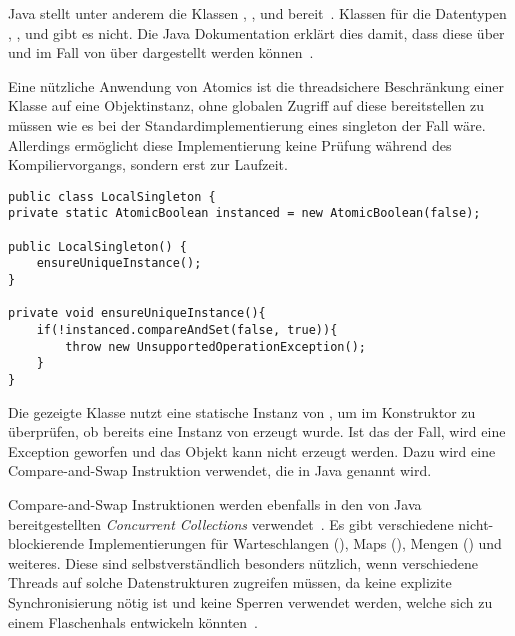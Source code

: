 Java stellt unter anderem die Klassen , ,  und 
bereit~\cite[S.~131]{Friesen2015}. Klassen für die Datentypen , ,  und  gibt es nicht. Die Java Dokumentation erklärt dies damit, dass diese über  und im Fall von  über  dargestellt werden können~\cite{Java7DocAtomic}.

Eine nützliche Anwendung von Atomics ist die threadsichere Beschränkung einer Klasse auf eine Objektinstanz, ohne globalen Zugriff auf diese bereitstellen zu müssen wie es bei der Standardimplementierung eines \gls{singleton} der Fall wäre. Allerdings ermöglicht diese Implementierung keine Prüfung während des Kompiliervorgangs, sondern erst zur Laufzeit.
\begin{lstlisting}
public class LocalSingleton {
private static AtomicBoolean instanced = new AtomicBoolean(false);

public LocalSingleton() {
	ensureUniqueInstance();
}

private void ensureUniqueInstance(){
	if(!instanced.compareAndSet(false, true)){
		throw new UnsupportedOperationException();
	}
}
\end{lstlisting}
Die gezeigte Klasse  nutzt eine statische Instanz von , um im Konstruktor zu überprüfen, ob bereits eine Instanz von  erzeugt wurde. Ist das der Fall, wird eine Exception geworfen und das Objekt kann nicht erzeugt werden. Dazu wird eine Compare-and-Swap Instruktion verwendet, die in Java  genannt wird.

Compare-and-Swap Instruktionen werden ebenfalls in den von Java bereitgestellten \emph{Concurrent Collections} verwendet~\cite[S. 133~f.]{Friesen2015}. Es gibt verschiedene nicht-blockierende Implementierungen für Warteschlangen (), Maps (), Mengen () und weiteres. Diese sind selbstverständlich besonders nützlich, wenn verschiedene Threads auf solche Datenstrukturen zugreifen müssen, da keine explizite Synchronisierung nötig ist und keine Sperren verwendet werden, welche sich zu einem Flaschenhals entwickeln könnten~\cite[S.~125~ff.]{Friesen2015}.

